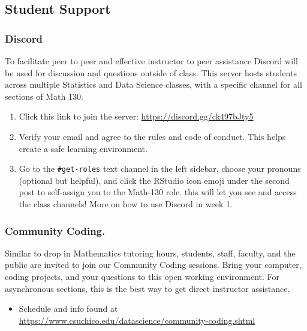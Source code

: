 \documentclass[
  11pt,
]{article}
\providecommand{\tightlist}{%
  \setlength{\itemsep}{0pt}\setlength{\parskip}{0pt}}
\begin{document}
\hypertarget{student-support}{%
\subsection{Student Support}\label{student-support}}

\hypertarget{discord}{%
\subsubsection{Discord}\label{discord}}

To facilitate peer to peer and effective instructor to peer assistance
Discord will be used for discussion and questions outside of class. This
server hosts students across multiple Statistics and Data Science
classes, with a specific channel for all sections of Math 130.

\begin{enumerate}
\def\labelenumi{\arabic{enumi}.}
\tightlist
\item
  Click this link to join the server:
  \url{https://discord.gg/ck497bJty5}
\item
  Verify your email and agree to the rules and code of conduct. This
  helps create a safe learning environment.
\item
  Go to the \texttt{\#get-roles} text channel in the left sidebar,
  choose your pronouns (optional but helpful), and click the RStudio
  icon emoji under the second post to self-assign you to the Math-130
  role. this will let you see and access the class channels! More on how
  to use Discord in week 1.
\end{enumerate}

\hypertarget{community-coding.}{%
\subsubsection{Community Coding.}\label{community-coding.}}

Similar to drop in Mathematics tutoring hours, students, staff, faculty,
and the public are invited to join our Community Coding sessions. Bring
your computer, coding projects, and your questions to this open working
environment. For asynchronous sections, this is the best way to get
direct instructor assistance.

\begin{itemize}
\tightlist
\item
  Schedule and info found at
  \url{https://www.csuchico.edu/datascience/community-coding.shtml}
\end{itemize}
\end{document}
